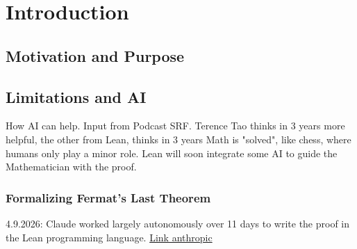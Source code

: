 

\chapter{Introduction}
\label{c:introduction}








\section{Motivation and Purpose}

\section{Limitations and AI}
How AI can help. Input from Podcast SRF. Terence Tao thinks in 3 years more helpful, the other from Lean, thinks in 3 years Math is "solved", like chess, where humans only play a minor role. Lean will soon integrate some AI to guide the Mathematician with the proof.

\subsection{Formalizing Fermat's Last Theorem}
4.9.2026: Claude worked largely autonomously over 11 days to write the proof in the Lean programming language. \href{https://www.anthropic.com/research/formalizing-fermats-last-theorem}{Link anthropic}

